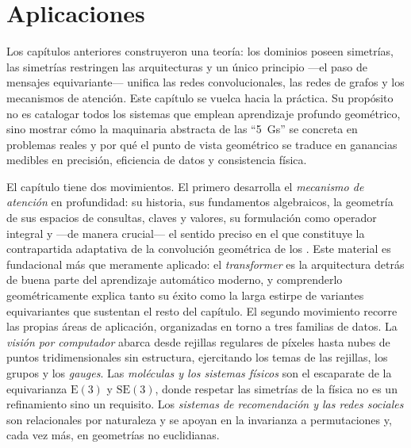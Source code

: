 \providecommand{\SO}{\mathrm{SO}}
\providecommand{\SE}{\mathrm{SE}}
\providecommand{\Eucl}{\mathrm{E}}
\providecommand{\Hyp}{\mathbb{H}}
\providecommand{\Attn}{\operatorname{Attention}}
\providecommand{\softmax}{\operatorname{softmax}}
\providecommand{\Concat}{\operatorname{Concat}}
\providecommand{\sigm}{\sigma}
\providecommand{\Lc}{\mathcal{L}}

\chapter{Aplicaciones}
\label{ch:applications}

Los cap\'itulos anteriores construyeron una teor\'ia: los dominios poseen
simetr\'ias, las simetr\'ias restringen las arquitecturas y un \'unico
principio ---el paso de mensajes equivariante--- unifica las redes
convolucionales, las redes de grafos y los mecanismos de atenci\'on. Este
cap\'itulo se vuelca hacia la pr\'actica. Su prop\'osito no es catalogar todos
los sistemas que emplean aprendizaje profundo geom\'etrico, sino mostrar c\'omo
la maquinaria abstracta de las ``5~Gs'' se concreta en problemas reales y por
qu\'e el punto de vista geom\'etrico se traduce en ganancias medibles en
precisi\'on, eficiencia de datos y consistencia f\'isica.

El cap\'itulo tiene dos movimientos. El primero desarrolla el \emph{mecanismo de
atenci\'on} en profundidad: su historia, sus fundamentos algebraicos, la
geometr\'ia de sus espacios de consultas, claves y valores, su formulaci\'on
como operador integral y ---de manera crucial--- el sentido preciso en el que
constituye la contrapartida adaptativa de la convoluci\'on geom\'etrica de los
. Este material es fundacional m\'as que meramente
aplicado: el \emph{transformer} es la arquitectura detr\'as de buena parte del
aprendizaje autom\'atico moderno, y comprenderlo geom\'etricamente explica tanto
su \'exito como la larga estirpe de variantes equivariantes que sustentan el
resto del cap\'itulo. El segundo movimiento recorre las propias \'areas de
aplicaci\'on, organizadas en torno a tres familias de datos. La \emph{visi\'on
por computador} abarca desde rejillas regulares de p\'ixeles hasta nubes de
puntos tridimensionales sin estructura, ejercitando los temas de las rejillas,
los grupos y los \emph{gauges}. Las \emph{mol\'eculas y los sistemas f\'isicos}
son el escaparate de la equivarianza $\Eucl(3)$ y $\SE(3)$, donde respetar las
simetr\'ias de la f\'isica no es un refinamiento sino un requisito. Los
\emph{sistemas de recomendaci\'on y las redes sociales} son relacionales por
naturaleza y se apoyan en la invarianza a permutaciones y, cada vez m\'as, en
geometr\'ias no euclidianas.

